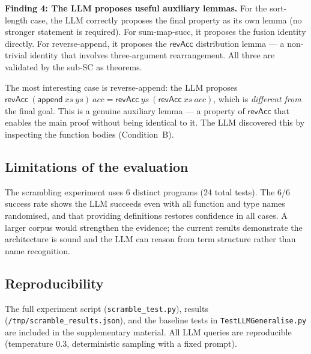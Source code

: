 \noindent
\textbf{Finding 4: The LLM proposes useful auxiliary lemmas.}
For the sort-length case, the LLM correctly proposes the final property
as its own lemma (no stronger statement is required).  For sum-map-succ,
it proposes the fusion identity directly.  For reverse-append, it proposes
the $\mathsf{revAcc}$ distribution lemma --- a non-trivial identity that
involves three-argument rearrangement.  All three are validated by the
sub-SC as \vmcompute{} theorems.

The most interesting case is reverse-append: the LLM proposes
$\mathsf{revAcc}\ (\mathsf{append}\ xs\ ys)\ acc = \mathsf{revAcc}\ ys\
(\mathsf{revAcc}\ xs\ acc)$, which is \emph{different from} the final goal.
This is a genuine auxiliary lemma --- a property of $\mathsf{revAcc}$ that
enables the main proof without being identical to it.  The LLM discovered
this by inspecting the function bodies (Condition~B).

\subsection{Limitations of the evaluation}

The scrambling experiment uses 6 distinct programs (24 total tests).
The 6/6 success rate shows the LLM succeeds even with all function
and type names randomised, and that providing definitions restores
confidence in all cases.  A larger corpus would strengthen the
evidence; the current results demonstrate the architecture is sound
and the LLM can reason from term structure rather than name recognition.

\subsection{Reproducibility}

The full experiment script (\texttt{scramble\_test.py}), results
(\texttt{/tmp/scramble\_results.json}), and the baseline tests in
\texttt{TestLLMGeneralise.py} are included in the supplementary
material.  All LLM queries are reproducible (temperature $0.3$,
deterministic sampling with a fixed prompt).
